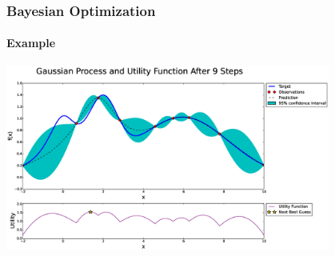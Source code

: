 \begin{frame}
	\frametitle{Bayesian Optimization}
	\framesubtitle{Example}
	
	\centering
	\includegraphics[width=0.8\textwidth]{figures/bayesian-optimization/fig7}
	
\end{frame}